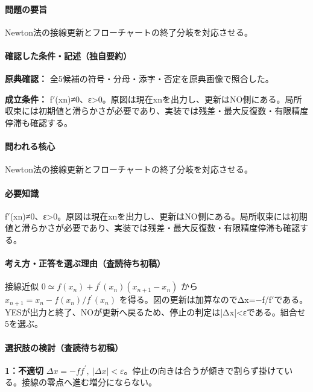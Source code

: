 \paragraph{問題の要旨} Newton法の接線更新とフローチャートの終了分岐を対応させる。

\paragraph{確認した条件・記述（独自要約）}\mbox{}\par

\noindent\textbf{原典確認：} 全5候補の符号・分母・添字・否定を原典画像で照合した。\par

\noindent\textbf{成立条件：} f\ensuremath{'}(xn)≠0、ε>0。原図は現在xnを出力し、更新はNO側にある。局所収束には初期値と滑らかさが必要であり、実装では残差・最大反復数・有限精度停滞も確認する。\par

\paragraph{問われる核心} Newton法の接線更新とフローチャートの終了分岐を対応させる。

\paragraph{必要知識} f\ensuremath{'}(xn)≠0、ε>0。原図は現在xnを出力し、更新はNO側にある。局所収束には初期値と滑らかさが必要であり、実装では残差・最大反復数・有限精度停滞も確認する。

\paragraph{考え方・正答を選ぶ理由（査読待ち初稿）} 接線近似 \(0\simeq f(x_n)+f^\prime(x_n)(x_{n+1}-x_n)\) から \(x_{n+1}=x_n-f(x_n)/f^\prime(x_n)\) を得る。図の更新は加算なのでΔx=−f/f\ensuremath{'}である。YESが出力と終了、NOが更新へ戻るため、停止の判定は|Δx|<εである。組合せ5を選ぶ。

\paragraph{選択肢の検討（査読待ち初稿）}\mbox{}\par

\noindent\textbf{1：不適切} \(\Delta x=-ff^\prime,\ |\Delta x|<\varepsilon\)。停止の向きは合うが傾きで割らず掛けている。接線の零点へ進む増分にならない。\par

